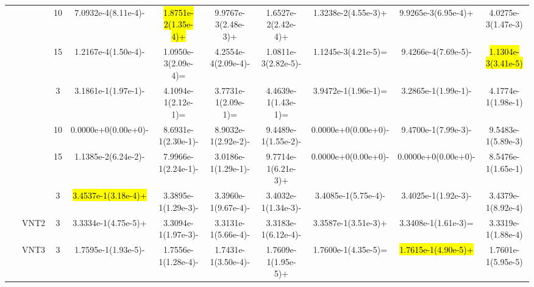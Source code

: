 \documentclass[a4paper,fleqn]{cas-dc}
\newcommand{\highlight}[1]{
	\begingroup
	\sethlcolor{Seashell}%
	\hl{#1}%
	\endgroup
}
\begin{document}
\begin{sloppypar}
\begin{table}[ht]
{\begin{tabular}{cccccccccc}
					\multirow{9}{*}{~}&\multirow{3}{*}{~} &10 &7.0932e-4(8.11e-4)- &\highlight{1.8751e-2(1.35e-4)+}	&9.9767e-3(2.48e-3)+	&1.6527e-2(2.42e-4)+	&1.3238e-2(4.55e-3)+	&9.9265e-3(6.95e-4)+	&4.0275e-3(1.47e-3)\\
					
					\multirow{9}{*}{~}&\multirow{3}{*}{~} &15 &1.2167e-4(1.50e-4)- &1.0950e-3(2.09e-4)=	&4.2554e-4(2.09e-4)-	&1.0811e-3(2.82e-5)-	&1.1245e-3(4.21e-5)=	&9.4266e-4(7.69e-5)-	&\highlight{1.1304e-3(3.41e-5)}\\
					
					
					
					
					
					
					
					\multirow{9}{*}{~}&\multirow{3}{*}{DTLZ3} &3 &3.1861e-1(1.97e-1)- &4.1094e-1(2.12e-1)=	&3.7731e-1(2.09e-1)=	&4.4639e-1(1.43e-1)=	&3.9472e-1(1.96e-1)=	&3.2865e-1(1.99e-1)-	&4.1774e-1(1.98e-1)\\ 
					
					\multirow{9}{*}{~}&\multirow{3}{*}{~} &10 &0.0000e+0(0.00e+0)-	&8.6931e-1(2.30e-1)-	&8.9032e-1(2.92e-2)-	&9.4489e-1(1.55e-2)-	&0.0000e+0(0.00e+0)-	&9.4700e-1(7.99e-3)-	&9.5483e-1(5.89e-3)\\
					
					\multirow{9}{*}{~}&\multirow{3}{*}{~} &15 &1.1385e-2(6.24e-2)-  &7.9966e-1(2.24e-1)-	&3.0186e-1(1.29e-1)-	&9.7714e-1(6.21e-3)+	&0.0000e+0(0.00e+0)-	&0.0000e+0(0.00e+0)-	&8.5476e-1(1.65e-1)\\
					
					
					
					
					
					
					\midrule[0.35pt]
					\multirow{8}{*}{Other}&{VNT1} &3  &\highlight{3.4537e-1(3.18e-4)+} &3.3895e-1(1.29e-3)-	&3.3960e-1(9.67e-4)-	&3.4032e-1(1.34e-3)-	&3.4085e-1(5.75e-4)-	&3.4025e-1(1.92e-3)-	&3.4379e-1(8.92e-4)\\ 
					
					\multirow{8}{*}{~}&{VNT2} &3 &3.3334e-1(4.75e-5)+ &3.3094e-1(1.97e-3)-	&3.3131e-1(5.66e-4)-	&3.3183e-1(6.12e-4)-	&3.3587e-1(3.51e-3)+	&3.3408e-1(1.61e-3)=	&3.3319e-1(1.88e-4)\\
					
					\multirow{8}{*}{~}&{VNT3} &3 &1.7595e-1(1.93e-5)- &1.7556e-1(1.28e-4)-	&1.7431e-1(3.50e-4)-	&1.7609e-1(1.95e-5)+	&1.7600e-1(4.35e-5)=	&\highlight{1.7615e-1(4.90e-5)+}	&1.7601e-1(5.95e-5)\\
					
					
					

\end{tabular}}
\end{table}
\end{sloppypar}
\end{document}
